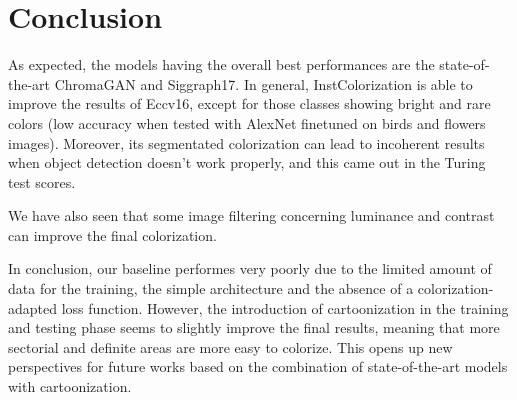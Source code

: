 \section{Conclusion}
As expected, the models having the overall best performances are the state-of-the-art ChromaGAN and Siggraph17. In general, InstColorization is able to improve the results of Eccv16, except for those classes showing bright and rare colors (low accuracy when tested with AlexNet finetuned on birds and flowers images). Moreover, its segmentated colorization can lead to incoherent results when object detection doesn't work properly, and this came out in the Turing test scores.

We have also seen that some image filtering concerning luminance and contrast can improve the final colorization.

In conclusion, our baseline performes very poorly due to the limited amount of data for the training, the simple architecture and the absence of a colorization-adapted loss function. However, the introduction of cartoonization in the training and testing phase seems to slightly improve the final results, meaning that more sectorial and definite areas are more easy to colorize. This opens up new perspectives for future works based on the combination of state-of-the-art models with cartoonization.
